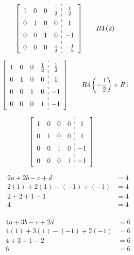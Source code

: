 \documentclass[fleqn]{article}
\begin{document}
    \begin{alignat*}{2}
      &\left[\def\arraystretch{1.5}
        \begin{array}{cccc:c}
          1 & 0 & 0 & \frac{1}{2} & \frac{1}{2} \\
          0 & 1 & 0 & 0 & 1 \\
          0 & 0 & 1 & 0 & -1 \\
          0 & 0 & 0 & \frac{1}{2} & -\frac{1}{2} 
        \end{array}
      \right]
      \quad
      && R4\left(2\right)
    \end{alignat*}

    \begin{alignat*}{2}
      &\left[\def\arraystretch{1.5}
        \begin{array}{cccc:c}
          1 & 0 & 0 & \frac{1}{2} & \frac{1}{2} \\
          0 & 1 & 0 & 0 & 1 \\
          0 & 0 & 1 & 0 & -1 \\
          0 & 0 & 0 & 1 & -1 
        \end{array}
      \right]
      \quad
      && R4\left(-\frac{1}{2}\right)+R1
    \end{alignat*}
    
    \begin{alignat*}{2}
      &\left[\def\arraystretch{1.5}
        \begin{array}{cccc:c}
          1 & 0 & 0 & 0 & 1 \\
          0 & 1 & 0 & 0 & 1 \\
          0 & 0 & 1 & 0 & -1 \\
          0 & 0 & 0 & 1 & -1 \\
        \end{array}
      \right]
      \quad
    \end{alignat*}

    \begin{align*}
      2a+2b-c+d&=4 \\
      2(1)+2(1) -(-1)+(-1) &= 4 \\
      2+2+1-1 &= 4 \\
      4 &= 4 \\
    \end{align*}

    \begin{align*}
      4a+3b-c+2d&=6 \\
      4(1)+3(1)-(-1)+2(-1) &= 6 \\
      4+3+1-2 &= 6 \\
      6 &= 6 \\
    \end{align*}
\end{document}
